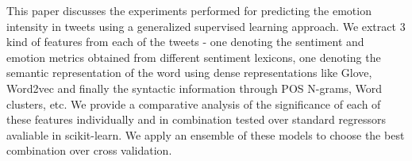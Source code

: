 This paper discusses the experiments performed for predicting the emotion intensity in tweets using a generalized supervised learning approach. We extract 3 kind of features from each of the tweets - one denoting the sentiment and emotion metrics obtained from different sentiment lexicons, one denoting the semantic representation of the word using dense representations like Glove, Word2vec and finally the syntactic information through POS N-grams, Word clusters, etc. We provide a comparative analysis of the significance of each of these features individually and in combination tested over standard regressors avaliable in scikit-learn. We apply an ensemble of these models to choose the best combination over cross validation.

